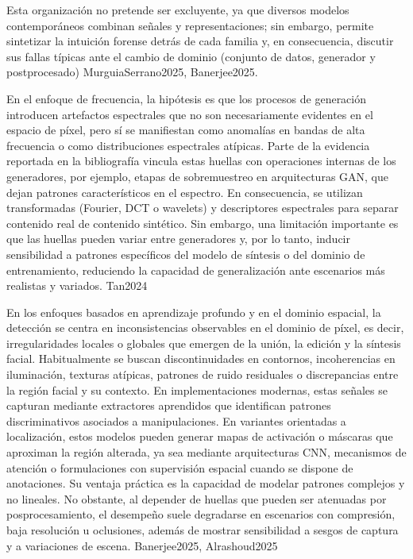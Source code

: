 Esta organización no pretende ser excluyente, ya que diversos modelos contemporáneos combinan señales y representaciones; sin embargo, permite sintetizar la intuición forense detrás de cada familia y, en consecuencia, discutir sus fallas típicas ante el cambio de dominio (conjunto de datos, generador y postprocesado) MurguiaSerrano2025, Banerjee2025.

En el enfoque de frecuencia, la hipótesis es que los procesos de generación introducen artefactos espectrales que no son necesariamente evidentes en el espacio de píxel, pero sí se manifiestan como anomalías en bandas de alta frecuencia o como distribuciones espectrales atípicas. Parte de la evidencia reportada en la bibliografía vincula estas huellas con operaciones internas de los generadores, por ejemplo, etapas de sobremuestreo en arquitecturas GAN, que dejan patrones característicos en el espectro. En consecuencia, se utilizan transformadas (Fourier, DCT o wavelets) y descriptores espectrales para separar contenido real de contenido sintético. Sin embargo, una limitación importante es que las huellas pueden variar entre generadores y, por lo tanto, inducir sensibilidad a patrones específicos del modelo de síntesis o del dominio de entrenamiento, reduciendo la capacidad de generalización ante escenarios más realistas y variados. Tan2024


En los enfoques basados en aprendizaje profundo y en el dominio espacial, la detección se centra en inconsistencias observables en el dominio de píxel, es decir, irregularidades locales o globales que emergen de la unión, la edición y la síntesis facial. Habitualmente se buscan discontinuidades en contornos, incoherencias en iluminación, texturas atípicas, patrones de ruido residuales o discrepancias entre la región facial y su contexto. En implementaciones modernas, estas señales se capturan mediante extractores aprendidos que identifican patrones discriminativos asociados a manipulaciones. En variantes orientadas a localización, estos modelos pueden generar mapas de activación o máscaras que aproximan la región alterada, ya sea mediante arquitecturas CNN, mecanismos de atención o formulaciones con supervisión espacial cuando se dispone de anotaciones. Su ventaja práctica es la capacidad de modelar patrones complejos y no lineales. No obstante, al depender de huellas que pueden ser atenuadas por posprocesamiento, el desempeño suele degradarse en escenarios con compresión, baja resolución u oclusiones, además de mostrar sensibilidad a sesgos de captura y a variaciones de escena. Banerjee2025, Alrashoud2025


